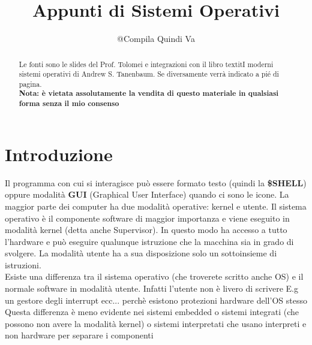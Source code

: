 \documentclass{article}
\title{Appunti di Sistemi Operativi}
\author{@Compila Quindi Va}
\date{}
\begin{document}
\pagestyle{fancy}
\fancyhf{}
\rhead{\thepage}
\lhead{\rightmark}
\rfoot{}


\maketitle
\renewcommand{\abstractname}{Disclaimer}
\begin{abstract}
    Le fonti sono le slides del Prof. Tolomei e integrazioni con il libro textit{I moderni sistemi operativi} di Andrew S. Tanenbaum. Se diversamente verrà indicato a pié di pagina.\\

    \textbf{Nota: è vietata assolutamente la vendita di questo materiale in qualsiasi forma senza il mio consenso}  
\end{abstract}

\tableofcontents

\pagebreak


\section{Introduzione}
Il programma con cui si interagisce può essere formato testo (quindi la \textbf{\$SHELL}) oppure modalità \textbf{GUI} (Graphical User Interface) quando ci sono le icone. La maggior parte dei computer ha due modalità operative: kernel e utente. Il sistema operativo è il componente software di maggior importanza e viene eseguito in modalità kernel (detta anche Supervisor). In questo modo ha accesso a tutto l'hardware e può eseguire qualunque istruzione che la macchina sia in  grado di svolgere. La modalità utente ha a sua disposizione solo un sottoinsieme di istruzioni.\\
Esiste una differenza tra il sistema operativo (che troverete scritto anche OS) e il normale software in modalità utente. Infatti l'utente non è livero di scrivere E.g un gestore degli interrupt ecc... perchè esistono protezioni hardware dell'OS stesso \\
Questa differenza è meno evidente nei sistemi embedded o sistemi integrati (che possono non avere la modalità kernel) o sistemi interpretati che usano interpreti e non hardware per separare i componenti
\end{document}
